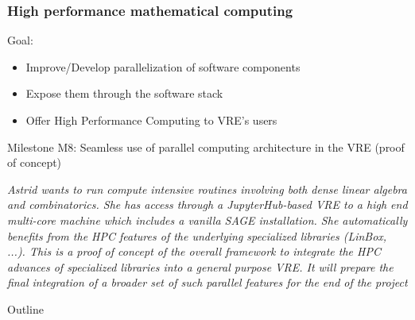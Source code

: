 \documentclass{beamer}
\begin{document}
\begin{frame}
  \frametitle{High performance mathematical computing}
  \begin{block}
    {Goal:}
    \begin{itemize}
    \item Improve/Develop parallelization of software components
    \item Expose them through the software stack
    \item Offer High Performance Computing to VRE's users
    \end{itemize}
  \end{block}

  \begin{block}
      {Milestone M8: Seamless use of parallel computing architecture in the VRE (proof of concept)}

{\footnotesize  \textit{Astrid wants to run compute intensive routines involving both dense linear algebra and combinatorics. She has access through a JupyterHub-based VRE to a high end multi-core machine which includes a vanilla SAGE installation.
She automatically benefits from the HPC features of the underlying specialized
libraries (LinBox, ...). This is a proof of concept of the overall framework to
integrate the HPC advances of specialized libraries into a general purpose
VRE. It will prepare the final integration of a broader set of such parallel
features for the end of the project}
  }

  \end{block}
\end{frame}



\begin{frame}
  {Outline}
  \tableofcontents
\end{frame}

\end{document}
